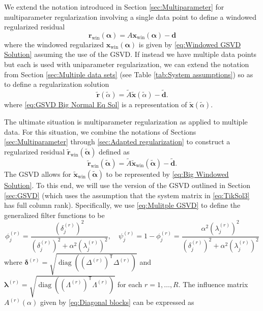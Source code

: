 \documentclass[12pt]{article}
\newcommand{\dVec}{\mathbf{d}}	%
\newcommand{\rVec}{\mathbf{r}}	%
\newcommand{\xVec}{\mathbf{x}}	%
\newcommand{\trans}[1]{{#1}^\mathsf{T}}	%
\DeclareMathOperator{\diag}{diag}	%
\newcommand{\regparam}{\alpha}  %
\newcommand{\regparamVec}{\bm{\regparam}}   %
\newcommand{\regparamVecBig}{\widetilde{\regparamVec}}   %
\newcommand{\xWin}{\xVec_{\text{win}}}	%
\newcommand{\xBig}{\widetilde{\xVec}}	%
\newcommand{\xWinBig}{\xBig_{\text{win}}}	%
\newcommand{\rBig}{\widetilde{\rVec}}	%
\newcommand{\rWinBig}{\rBig_{\text{win}}}	%
\newcommand{\dBig}{\widetilde{\dVec}}	%
\newcommand{\ABig}{\widetilde{A}}	%
\newcommand{\filt}{\phi}
\newcommand{\mfilt}{\psi}
\newcommand{\rWin}{\rVec_{\text{win}}}	%
\begin{document}
We extend the notation introduced in Section \ref{sec:Multiparameter} for multiparameter regularization involving a single data point to define a windowed regularized residual
\begin{equation}
\label{eq:Windowed regularized residual}
\rWin(\regparamVec) = A\xWin(\regparamVec) - \dVec
\end{equation}
where the windowed regularized $\xWin(\regparamVec)$ is given by \eqref{eq:Windowed GSVD Solution} assuming the use of the GSVD. If instead we have multiple data points but each is used with uniparameter regularization, we can extend the notation from Section \ref{sec:Multiple data sets} (see Table \ref{tab:System assumptions}) so as to define a regularization solution
\begin{equation}
\label{eq:Big regularized residual}
\rBig(\widetilde{\regparam}) = \ABig\xBig(\widetilde{\regparam}) - \dBig. 
\end{equation}
where \eqref{eq:GSVD Big Normal Eq Sol} is a representation of $\xBig(\widetilde{\regparam})$. \par 
The ultimate situation is multiparameter regularization as applied to multiple data. For this situation, we combine the notations of Sections \ref{sec:Multiparameter} through \ref{sec:Adapted regularization} to construct a regularized residual $\rWinBig(\regparamVecBig)$ defined as
\begin{equation}
\label{eq:Windowed Big regularized residual}
\rWinBig(\regparamVecBig) = \ABig\xWinBig(\regparamVecBig) - \dBig. 
\end{equation}
The GSVD allows for $\xWinBig(\regparamVecBig)$ to be represented by \eqref{eq:Big Windowed Solution}.
To this end, we will use the version of the GSVD outlined in Section \ref{sec:GSVD} (which uses the assumption that the system matrix in \eqref{eq:TikSol3} has full column rank). Specifically, we use \eqref{eq:Mulitple GSVD} to define the generalized filter functions to be
\begin{equation}
\label{eq:Filter functions 2}
\filt^{(r)}_j = \frac{\left(\delta^{(r)}_j\right)^2}{\left(\delta^{(r)}_j\right)^2 + \regparam^2 \left(\lambda^{(r)}_j\right)^2}, \quad \mfilt^{(r)}_j = 1 - \filt^{(r)}_j = \frac{\regparam^2 \left(\lambda^{(r)}_j\right)^2}{\left(\delta^{(r)}_j\right)^2 + \regparam^2 \left(\lambda^{(r)}_j\right)^2}
\end{equation}
where $\bm{\delta}^{(r)} = \sqrt{\diag(\trans{(\Delta^{(r)})}\Delta^{(r)})}$ and $\bm{\lambda}^{(r)} = \sqrt{\diag(\trans{(\Lambda^{(r)})}\Lambda^{(r)})}$ for each $r = 1,\ldots,R$. The influence matrix $A^{(r)}(\regparam)$ given by \eqref{eq:Diagonal blocks} can be expressed as
\end{document}
